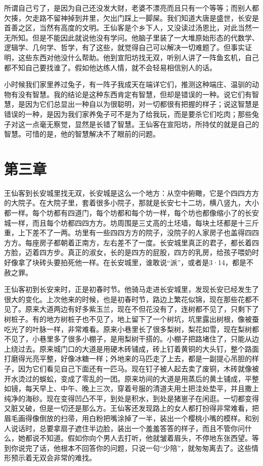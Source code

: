 所谓自己亏了，是因为自己还没发大财，老婆不漂亮而且只有一个等等；而别人都欠揍，欠走路不留神掉到井里，欠出门踩上一脚屎。我们知道大唐是盛世，长安是首善之区，当然有高度的文明。王仙客是个乡下人，又没读过汤恩比，对此当然一无所知。但是不能因此就说他没有学问。他脑子里装了一大堆原始形态的代数学、逻辑学、几何学、哲学，有了这些，就觉得自己可以解决一切难题了。但事实证明，这些东西对他没什么帮助。他到宣阳坊找无双，听别人讲了一阵鱼玄机，自己都不知自己要找谁了。假如他达练人情，就不会轻易相信别人的话。 

小时候我们家里养过兔子，有一阵子我成天在端详它们，推测这种端庄、温驯的动物有没有智慧。我的结论是这种东西肯定有智慧，但却是错误的一种。说它们有智慧，是因为它们总显出一种自以为很聪明，对一切都很有把握的样子；说这智慧是错误的一种，是因为我们家养兔子可不是为了给我玩，而是要杀它们吃肉；那些兔子对这一点毫无察觉，显然是长错了智慧。王仙客在宣阳坊，所持仗的就是自己的智慧。可惜的是，他的智慧解决不了眼前的问题。

\section{第三章}

王仙客到长安城里找无双，长安城是这么一个地方：从空中俯瞰，它是个四四方方的大院子。在大院子里，套着很多小院子，那就是长安七十二坊，横八竖九，大小都一样。每个坊都有四道门，每个坊都和每个坊一样，每个坊也都像缩小了的长安城一样，而且每个坊都四四方方。坊周围是三丈高的土坯墙，每块土坯都是十三斤重，上下差不了一两。坊里有一些四四方方的院子，没院子的人家房子也盖得四四方方。每座房子都朝着正南方，左右差不了一度。长安城里真正的君子，都长着四方脸，迈着四方步。真正的淑女，长的是四方的屁股，四方的乳房，给孩子喂奶时好像拿了块砖头要拍死他一样。在长安城里，谁敢说“派”，或者是3·14，都是不赦之罪。 

王仙客初到长安来时，正是初春时节。他骑马走进长安城里，发现长安已经发生了很大的变化。上次他来的时候，也是初春时节，路边上繁花似锦，现在那些花都不见了。原来大道两边有好多紫玉兰，现在不但花没有了，连树都不见了，只剩下了树桩子。有的地方树桩子也不见了，地上留下了一个树坑，坑里露出树根，像被蚕吃光了的叶脉一样，非常难看。原来小巷里长了很多梨树，梨花如雪，现在梨树都不见了，小巷里多了很多小棚子，是用梨树干搭的。小棚子把路堵住了，只能从边上绕过去。原来城门口的大道是用硬木砖铺成，砖上钉着黄铜的大头钉，整个路面打磨得光亮平整，好像冰糖一样；外地来的马匹走了上去，都是一副提心吊胆的样子，因为它们看见自己下面还有一匹马。现在钉子被人起去卖了废铜，木砖就像被开水烫过的蜈蚣，变成了零乱的一团。原来坊间的大道是用蒸后的黄土铺成，平整如镜，每天早上、中午、晚上三次，穿着号服的清道夫用土把洼处垫平，并且撒上纯净的海砂。现在变得凹凸不平，到处是积水，到处是猪崽子在闲逛。一切都变得又脏又破，但是一切还是那么方。王仙客还发现路上的女人都打扮得非常难看，把眉毛画得像倒放的扫帚，用白粉把嘴涂掉了一半，装出一个樱桃小嘴的模样。和别人说话时，总要拿扇子遮住半边脸，装出一个羞羞答答的样子，而且不管你问什么，她都说不知道。假如你向个男人去打听，他就皱着眉头，不停地东张西望。等到你说完了话，他根本不回答你的问题，只说一句“少陪”，就匆匆离去了。这些情形预示着无双会非常的难找。 

